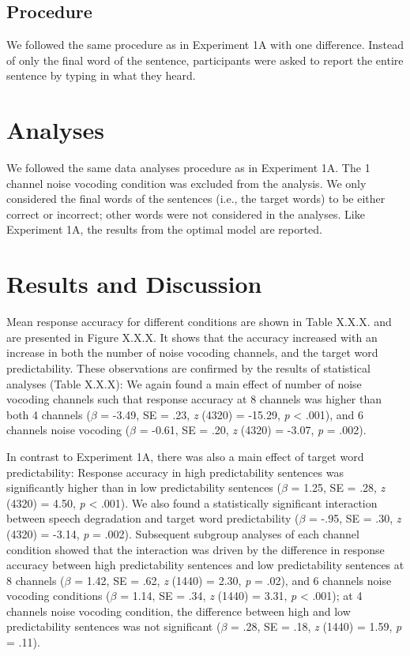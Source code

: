 \documentclass[a4paper, nobind]{templates/ociamthesis}
\begin{document}
\hypertarget{procedure-1}{%
\subsection{Procedure}\label{procedure-1}}

We followed the same procedure as in Experiment 1A with one difference.
Instead of only the final word of the sentence, participants were asked to report the entire sentence by typing in what they heard.

\hypertarget{analyses-1}{%
\section{Analyses}\label{analyses-1}}

We followed the same data analyses procedure as in Experiment 1A.
The 1 channel noise vocoding condition was excluded from the analysis.
We only considered the final words of the sentences (i.e., the target words) to be either correct or incorrect; other words were not considered in the analyses.
Like Experiment 1A, the results from the optimal model are reported.

\hypertarget{results-and-discussion-1}{%
\section{Results and Discussion}\label{results-and-discussion-1}}

Mean response accuracy for different conditions are shown in Table X.X.X. and are presented in Figure X.X.X.
It shows that the accuracy increased with an increase in both the number of noise vocoding channels, and the target word predictability.
These observations are confirmed by the results of statistical analyses (Table X.X.X):
We again found a main effect of number of noise vocoding channels such that response accuracy at 8 channels was higher than both 4 channels (\(\beta\) = -3.49, SE = .23, \emph{z} (4320) = -15.29, \emph{p} \textless{} .001), and 6 channels noise vocoding (\(\beta\) = -0.61, SE = .20, \emph{z} (4320) = -3.07, \emph{p} = .002).

In contrast to Experiment 1A, there was also a main effect of target word predictability:
Response accuracy in high predictability sentences was significantly higher than in low predictability sentences (\(\beta\) = 1.25, SE = .28, \emph{z} (4320) = 4.50, \emph{p} \textless{} .001).
We also found a statistically significant interaction between speech degradation and target word predictability (\(\beta\) = -.95, SE = .30, \emph{z} (4320) = -3.14, \emph{p} = .002).
Subsequent subgroup analyses of each channel condition showed that the interaction was driven by the difference in response accuracy between high predictability sentences and low predictability sentences at 8 channels (\(\beta\) = 1.42, SE = .62, \emph{z} (1440) = 2.30, \emph{p} = .02), and 6 channels noise vocoding conditions (\(\beta\) = 1.14, SE = .34, \emph{z} (1440) = 3.31, \emph{p} \textless{} .001);
at 4 channels noise vocoding condition, the difference between high and low predictability sentences was not significant (\(\beta\) = .28, SE = .18, \emph{z} (1440) = 1.59, \emph{p} = .11).
\end{document}
